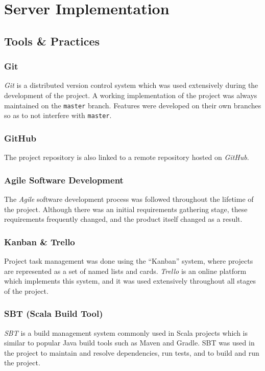 \documentclass{l4proj}
\newcommand{\code}[1]{\texttt{#1}}
\begin{document}
\section{Server Implementation}

    \subsection{Tools \& Practices}
    
             \subsubsection{Git}
         \textit{Git} is a distributed version control system which was used extensively during the development of the project. A working implementation of the project was always maintained on the \code{master} branch. Features were developed on their own branches so as to not interfere with \code{master}.
         
             \subsubsection{GitHub}
             The project repository is also linked to a remote repository hosted on \textit{GitHub}.
             
             \subsubsection{Agile Software Development}
             The \textit{Agile} software development process was followed throughout the lifetime of the project. Although there was an initial requirements gathering stage, these requirements frequently changed, and the product itself changed as a result.
             
             
             \subsubsection{Kanban \& Trello}
             Project task management was done using the ``Kanban'' system, where projects are represented as a set of named lists and cards. \textit{Trello} is an online platform which implements this system, and it was used extensively throughout all stages of the project.
         
             \subsubsection{SBT (Scala Build Tool)}
         \textit{SBT} is a build management system commonly used in Scala projects which is similar to popular Java build tools such as Maven and Gradle. SBT was used in the project to maintain and resolve dependencies, run tests, and to build and run the project.
\end{document}
